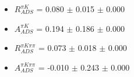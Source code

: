 \begin{itemize}
\item $R_{ADS}^{\pi K}$ = 0.080 $\pm$ 0.015 $\pm$ 0.000
\item $A_{ADS}^{\pi K}$ = 0.194 $\pm$ 0.186 $\pm$ 0.000
\item $R_{ADS}^{\pi K\pi\pi}$ = 0.073 $\pm$ 0.018 $\pm$ 0.000
\item $A_{ADS}^{\pi K\pi\pi}$ = -0.010 $\pm$ 0.243 $\pm$ 0.000
\end{itemize}
